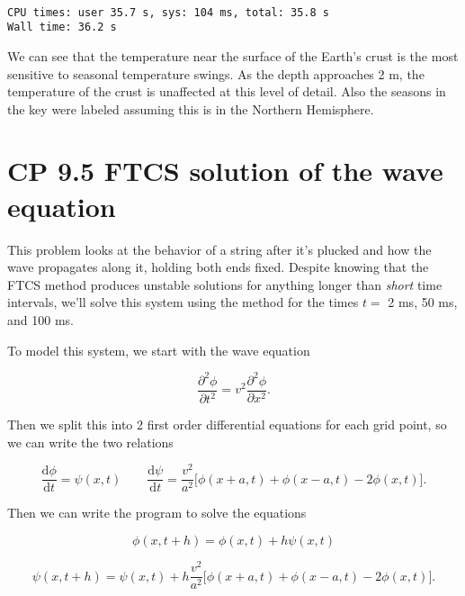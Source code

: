 \documentclass[11pt]{article}
\begin{document}
    \begin{center}
    \end{center}
    { \hspace*{\fill} \\}
    
    \begin{Verbatim}[commandchars=\\\{\}]
CPU times: user 35.7 s, sys: 104 ms, total: 35.8 s
Wall time: 36.2 s

    \end{Verbatim}

    We can see that the temperature near the surface of the Earth's crust is
the most sensitive to seasonal temperature swings. As the depth
approaches 2 m, the temperature of the crust is unaffected at this level
of detail. Also the seasons in the key were labeled assuming this is in
the Northern Hemisphere.

    \section{CP 9.5 FTCS solution of the wave
equation}\label{cp-9.5-ftcs-solution-of-the-wave-equation}

This problem looks at the behavior of a string after it's plucked and
how the wave propagates along it, holding both ends fixed. Despite
knowing that the FTCS method produces unstable solutions for anything
longer than \emph{short} time intervals, we'll solve this system using
the method for the times \(t =\) 2 ms, 50 ms, and 100 ms.

To model this system, we start with the wave equation

\[\frac{\partial^2\phi}{\partial t^2} = v^2 \frac{\partial^2\phi}{\partial x^2}.\]

Then we split this into 2 first order differential equations for each
grid point, so we can write the two relations

\[\frac{\text{d}\phi}{\text{d}t} = \psi(x,t) \qquad \frac{\text{d}\psi}{\text{d}t} = \frac{v^2}{a^2}\bigr[\phi(x+a,t) + \phi(x-a,t) - 2\phi(x,t)\bigr].\]

Then we can write the program to solve the equations

\begin{equation}
\phi(x,t+h) = \phi(x,t) + h\psi(x,t)
\end{equation}

\begin{equation*}
\psi(x,t+h) = \psi(x,t) + h\frac{v^2}{a^2}\bigr[\phi(x+a,t) + \phi(x-a,t) - 2\phi(x,t)\bigr].
\end{equation*}
\end{document}
